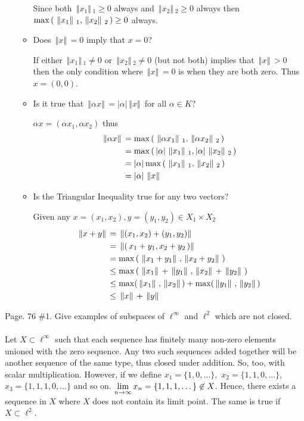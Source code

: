 \documentclass[10pt,a4paper]{report}
\newcommand{\NORM}[1]{\,\left \Vert #1 \right \Vert\,}
\begin{document}
\begin{enumerate}
\begin{itemize}
		Since both $\NORM{x_1}_1 \ge 0$ always and $\NORM{x_2}_2 \ge 0$ always then $\max\PAREN{\NORM{x_1}_1, \NORM{x_2}_2} \ge 0$ always.
		
		\item Does $\NORM{x} = 0$ imply that $x=0$?

		If either $\NORM{x_1}_1 \ne 0$ or $\NORM{x_2}_2 \ne 0$ (but not both) implies that $\NORM{x} > 0$ then the only condition where $\NORM{x}=0$ is when they are both zero.  Thus $x = (0,0)$.
		
		\item Is it true that $\NORM{\alpha x} = |\alpha| \NORM{x}$ for all $\alpha \in K$?
		
		$\alpha x = (\alpha x_1, \alpha x_2)$ thus 
		\begin{align*}
			\NORM{\alpha x} &= \max\PAREN{\NORM{\alpha x_1}_1, \NORM{\alpha x_2}_2} \\
				&= \max\PAREN{|\alpha|\NORM{ x_1}_1, |\alpha|\NORM{x_2}_2} \\
				&= |\alpha|\max\PAREN{\NORM{ x_1}_1, \NORM{x_2}_2}  \\
				&= |\alpha|\NORM{x}
		\end{align*}		  
		
		\item Is the Triangular Inequality true for any two vectors?
		
		Given any $x=(x_1, x_2),y=(y_1,y_2) \in X_1 \times X_2$
		\begin{align*}
			\NORM{x+y} &= \NORM{(x_1, x_2)+(y_1,y_2)} \\
				&= \NORM{\PAREN{x_1+y_1, x_2+y_2 }} \\
				&= \max\PAREN{\NORM{x_1+y_1}, \NORM{x_2+y_2} }\\
				&\le \max\PAREN{\NORM{x_1}+\NORM{y_1}, \NORM{x_2}+\NORM{y_2} }\\
				&\le \max(\NORM{x_1},\NORM{x_2}) + \max(\NORM{y_1}, \NORM{y_2}) \\
				&\le \NORM{x} + \NORM{y}
		\end{align*}
	\end{itemize}
\end{enumerate}

\newpage

Page. 76 \#1.  Give examples of subspaces of $\ell^\infty$ and $\ell^2$ which are not closed.\\
\\
Let $X \subset \ell^\infty$ such that each sequence has finitely many non-zero elements unioned with the zero sequence.  Any two such sequences added together will be another sequence of the same type, thus closed under addition.  So, too, with scalar multiplication.  However, if we define $x_1 = \{1, 0, \dots \},$ $x_2 = \{1,1,0,\dots \}$, $x_3=\{1,1,1,0,\dots\}$ and so on.  $\underset{n\to \infty}\lim\, x_n = \{1,1,1,\dots\} \not \in X$.  Hence, there exists a sequence in $X$ where $X$ does not contain its limit point.  The same is true if $X \subset \ell^2$.
\end{document}
